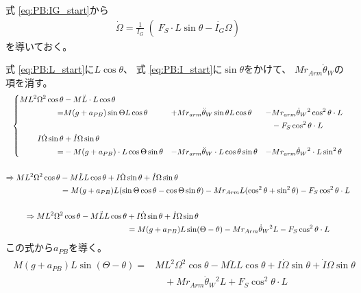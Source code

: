 \documentclass[a4paper,11pt]{jsarticle}
\begin{document}
式 \ref{eq:PB:IG_start}から
\begin{gather}
  \dot{\Omega} = 
  \left.\frac{1}{I_G}\middle(
    F_S \cdot L\sin\theta
    -\dot{I_G}\Omega
  \right)
  \label{eq:Omega}
\end{gather}
を導いておく。

式 \ref{eq:PB:L_start}に$L\cos\theta$、
式 \ref{eq:PB:I_start}に$\sin\theta$をかけて、
$Mr_{Arm}\ddot{\theta}_W$の項を消す。
\begin{gather}
  \left\{
  \begin{aligned}  
    ML^2\Omega^2 \cos\theta &- M\ddot{L} \cdot L \cos\theta
    &&&&
    \\
    =& M(g+a_{PB})\sin\Theta L\cos\theta
    &+& Mr_{arm}\ddot{\theta}_W\sin\theta L\cos\theta
    &-& Mr_{arm}\dot{\theta}_W{}^2\cos^2\theta \cdot L
    \\
    &&&&&- F_S\cos^2\theta \cdot L
    \\
    I\dot\Omega \sin\theta &+ \dot{I}\Omega \sin\theta
    &&&&
    \\
    =& -M(g+a_{PB}) \cdot L\cos\Theta \sin\theta
    &-& Mr_{arm}\ddot{\theta}_W \cdot L \cos\theta \sin\theta
    &-& Mr_{arm}\dot{\theta}_W{}^2 \cdot L \sin^2\theta
  \end{aligned}
  \right.
  \notag
  \\
  \quad \notag
  \\
  \begin{aligned}
    \Rightarrow
    ML^2\Omega^2 \cos\theta &- M\ddot{L}L \cos\theta + I\dot\Omega \sin\theta + \dot{I}\Omega \sin\theta
    \\
    &= M(g+a_{PB}) L(\sin\Theta \cos\theta - \cos\Theta \sin\theta)
    - Mr_{Arm}L(\cos^2\theta + \sin^2\theta)
    - F_S\cos^2\theta \cdot L
  \end{aligned}
  \notag
  \\
  \notag
  \\
  \begin{aligned}
    \Rightarrow
    ML^2\Omega^2 \cos\theta - M\ddot{L}L \cos\theta &+ I\dot\Omega \sin\theta + \dot{I}\Omega \sin\theta
    \\
    &= 
    M(g+a_{PB}) L\sin(\Theta - \theta) - Mr_{Arm}\dot{\theta}_W{}^2L - F_S\cos^2\theta \cdot L
  \end{aligned}
  \notag
\end{gather}
この式から$a_{PB}$を導く。
\begin{align}
  \begin{aligned}
    M(g+a_{PB}) L\sin(\Theta - \theta)
    =&
    ML^2\Omega^2 \cos\theta - M\ddot{L}L \cos\theta + I\dot\Omega \sin\theta + \dot{I}\Omega \sin\theta
    \\
    &\quad + Mr_{Arm}\dot{\theta}_W{}^2L + F_S\cos^2\theta \cdot L
  \end{aligned}
\end{align}
\end{document}
